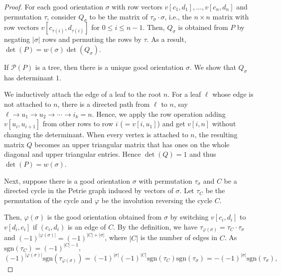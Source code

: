 \documentclass[pdflatex,sn-mathphys-num]{sn-jnl}%
\theoremstyle{thmstyleone}%
\theoremstyle{thmstyletwo}%
\theoremstyle{thmstylethree}%
\numberwithin{equation}{section}
\begin{document}
        \begin{proof}
            For each good orientation $\sigma$ with row vectors $v[c_1,d_1],\dotsc,v[c_n,d_n]$ and permutation $\tau$, consider $Q_\sigma$ to be the matrix of $\tau_\sigma\cdot \sigma$, i.e., the $n\times n$ matrix with row vectors $v[c_{\tau(i)},d_{\tau(i)}]$ for $0\leq i\leq n-1$. Then, $Q_\sigma$ is obtained from $P$ by negating $|\sigma|$ rows and permuting the rows by $\tau$. As a result, $\det(P)=w(\sigma)\det(Q_\sigma)$.
            
            If $\mathcal{P}(P)$ is a tree, then there is a unique good orientation $\sigma$. We show that $Q_\sigma$ has determinant $1$.

            We inductively attach the edge of a leaf to the root $n$. For a leaf $\ell$ whose edge is not attached to $n$, there is a directed path from $\ell$ to $n$, say $\ell\to u_1\to u_2\to \cdots\to i_k=n$. Hence, we apply the row operation adding $v[u_{i},u_{i+1}]$ from other rows to row $i$ ($=v[i,u_1]$) and get $v[i,n]$ without changing the determinant. When every vertex is attached to $n$, the resulting matrix $Q$ becomes an upper triangular matrix that has ones on the whole diagonal and upper triangular entries. Hence $\det(Q)=1$ and thus $\det(P)=w(\sigma)$.

            Next, suppose there is a good orientation $\sigma$ with permutation $\tau_\sigma$ and $C$ be a directed cycle in the Petrie graph induced by vectors of $\sigma$. 
            Let $\tau_C$ be the permutation of the cycle and $\varphi$ be the involution reversing the cycle $C$.
            
            Then, $\varphi(\sigma)$ is the good orientation obtained from $\sigma$ by switching $v[c_i,d_i]$ to $v[d_i,c_i]$ if $(c_i,d_i)$ is an edge of $C$. By the definition, we have $\tau_{\varphi(\sigma)} = \tau_C\cdot \tau_\sigma$ and $(-1)^{|\varphi(\sigma)|}=(-1)^{|C|+|\sigma|}$, where $|C|$ is the number of edges in $C$. As $\mathrm{sgn}(\tau_C)=(-1)^{|C|-1}$,
            \[(-1)^{|\varphi(\sigma)|}\mathrm{sgn}(\tau_{\varphi(\sigma)}) = (-1)^{|\sigma|} (-1)^{|C|} \mathrm{sgn}(\tau_C)\mathrm{sgn}(\tau_\sigma)= -(-1)^{|\sigma|}\mathrm{sgn}(\tau_\sigma),\]
            
        \end{proof}
\end{document}

